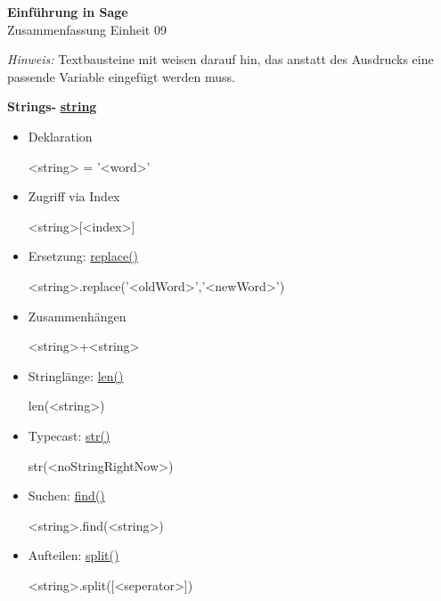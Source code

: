 \documentclass[a4paper,9pt,DIV15]{scrartcl}
\begin{document}
\begin{center}
    \textbf{\LARGE Einführung in Sage}\\
    {\large Zusammenfassung Einheit 09}
\end{center}
\textsl{Hinweis:} Textbausteine mit  weisen darauf hin, das anstatt des Ausdrucks eine passende Variable eingefügt werden muss.

\medskip

\textbf{Strings- }\href{http://docs.python.org/library/string.html?highlight=string.replace#string-constants}{\textbf{string}}
\begin{itemize}
 \item Deklaration
\begin{sagein}
<string> = '<word>'
\end{sagein}
\item Zugriff via Index
\begin{sagein}
<string>[<index>]
\end{sagein}
\item Ersetzung: \href{http://docs.python.org/library/string.html?highlight=string.replace#string.replace}{replace()}
\begin{sagein}
<string>.replace('<oldWord>','<newWord>')
\end{sagein}
\item Zusammenhängen
\begin{sagein}
 <string>+<string>
\end{sagein}
\item Stringlänge: \href{http://docs.python.org/library/functions.html?highlight=print#len}{len()}
\begin{sagein}
 len(<string>)
\end{sagein}
\item Typecast: \href{http://docs.python.org/library/functions.html?highlight=print#str}{str()}
\begin{sagein}
str(<noStringRightNow>)
\end{sagein}
\item Suchen: \href{http://docs.python.org/library/string.html?highlight=string.replace#string.find}{find()}
\begin{sagein}
 <string>.find(<string>)
\end{sagein}
\item Aufteilen: \href{http://docs.python.org/library/string.html?highlight=string.replace#string.split}{split()}
\begin{sagein}
 <string>.split([<seperator>])

\end{sagein}
\end{itemize}
\end{document}
